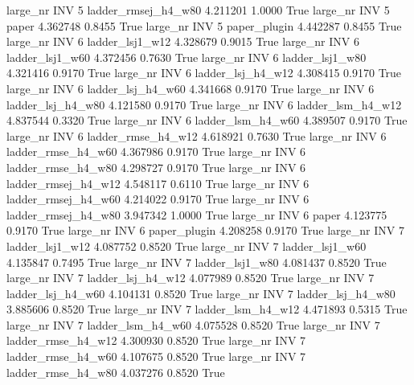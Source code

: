  large_nr      INV                 5 ladder_rmsej_h4_w80   4.211201      1.0000    True
  large_nr      INV                 5               paper   4.362748      0.8455    True
  large_nr      INV                 5        paper_plugin   4.442287      0.8455    True
  large_nr      INV                 6     ladder_lsj1_w12   4.328679      0.9015    True
  large_nr      INV                 6     ladder_lsj1_w60   4.372456      0.7630    True
  large_nr      INV                 6     ladder_lsj1_w80   4.321416      0.9170    True
  large_nr      INV                 6   ladder_lsj_h4_w12   4.308415      0.9170    True
  large_nr      INV                 6   ladder_lsj_h4_w60   4.341668      0.9170    True
  large_nr      INV                 6   ladder_lsj_h4_w80   4.121580      0.9170    True
  large_nr      INV                 6   ladder_lsm_h4_w12   4.837544      0.3320    True
  large_nr      INV                 6   ladder_lsm_h4_w60   4.389507      0.9170    True
  large_nr      INV                 6  ladder_rmse_h4_w12   4.618921      0.7630    True
  large_nr      INV                 6  ladder_rmse_h4_w60   4.367986      0.9170    True
  large_nr      INV                 6  ladder_rmse_h4_w80   4.298727      0.9170    True
  large_nr      INV                 6 ladder_rmsej_h4_w12   4.548117      0.6110    True
  large_nr      INV                 6 ladder_rmsej_h4_w60   4.214022      0.9170    True
  large_nr      INV                 6 ladder_rmsej_h4_w80   3.947342      1.0000    True
  large_nr      INV                 6               paper   4.123775      0.9170    True
  large_nr      INV                 6        paper_plugin   4.208258      0.9170    True
  large_nr      INV                 7     ladder_lsj1_w12   4.087752      0.8520    True
  large_nr      INV                 7     ladder_lsj1_w60   4.135847      0.7495    True
  large_nr      INV                 7     ladder_lsj1_w80   4.081437      0.8520    True
  large_nr      INV                 7   ladder_lsj_h4_w12   4.077989      0.8520    True
  large_nr      INV                 7   ladder_lsj_h4_w60   4.104131      0.8520    True
  large_nr      INV                 7   ladder_lsj_h4_w80   3.885606      0.8520    True
  large_nr      INV                 7   ladder_lsm_h4_w12   4.471893      0.5315    True
  large_nr      INV                 7   ladder_lsm_h4_w60   4.075528      0.8520    True
  large_nr      INV                 7  ladder_rmse_h4_w12   4.300930      0.8520    True
  large_nr      INV                 7  ladder_rmse_h4_w60   4.107675      0.8520    True
  large_nr      INV                 7  ladder_rmse_h4_w80   4.037276      0.8520    True
